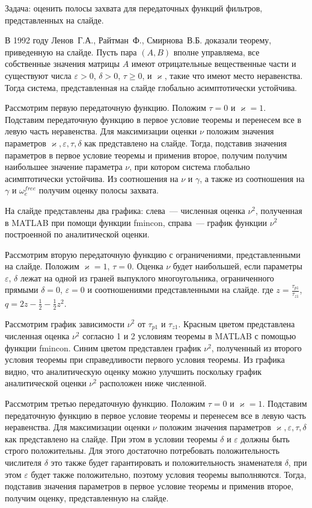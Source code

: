 \documentclass[a4paper,article,14pt]{extarticle}
\begin{document}
Задача: оценить полосы захвата для передаточных функций фильтров, представленных на слайде.
    
В 1992 году Ленов~Г.\:А., Райтман~Ф., Смирнова~В.\:Б. доказали теорему, приведенную на слайде. Пусть пара $(A, B)$ вполне управляема, все собственные значения матрицы $A$ имеют отрицательные вещественные части и существуют числа $\varepsilon > 0$, $\delta > 0$, $\tau \geqslant 0$, и $\varkappa$, такие что имеют место неравенства. Тогда система, представленная на слайде глобально асимптотически устойчива.

Рассмотрим первую передаточную функцию. Положим $\tau = 0$ и $\varkappa = 1$. Подставим передаточную функцию в первое условие теоремы и перенесем все в левую часть неравенства. Для максимизации оценки $\nu$ положим значения параметров $\varkappa, \varepsilon, \tau, \delta$ как представлено на слайде. Тогда, подставив значения параметров в первое условие теоремы и применив второе, получим получим наибольшее значение параметра $\nu$, при котором система глобально асимптотически устойчива. Из соотношения на $\nu$ и $\gamma$, а также из соотношения на $\gamma$ и $\omega_e^{free}$ получим оценку полосы захвата.

На слайде представлены два графика: слева~--- численная оценка $\nu^2$, полученная в MATLAB при помощи функции fmincon, справа~--- график функции $\nu^2$ построенной по аналитической оценки.

Рассмотрим вторую передаточную функцию с ограничениями, представленными на слайде. Положим $\varkappa=1$, $\tau=0$. Оценка $\nu$ будет наибольшей, если параметры $\varepsilon$, $\delta$ лежат на одной из граней выпуклого многоугольника, ограниченного прямыми $\delta = 0$, $\varepsilon = 0$ и соотношениями представленными на слайде. где $z = \frac{\tau_{p1}}{\tau_{z1}}$, $q = 2z - \frac{1}{2} - \frac{1}{2}z^2$. 

Рассмотрим график зависимости $\nu^2$ от $\tau_{p1}$ и $\tau_{z1}$. Красным цветом представлена численная оценка $\nu^2$ согласно 1 и 2 условиям теоремы в MATLAB с помощью функции fmincon. Синим цветом представлен график $\nu^2$, полученный из второго условия теоремы при справедливости первого условия теоремы. Из графика видно, что аналитическую оценку можно улучшить поскольку график аналитической оценки $\nu^2$ расположен ниже численной.

Рассмотрим третью передаточную функцию. Положим $\tau = 0$ и $\varkappa = 1$. Подставим передаточную функцию в первое условие теоремы и перенесем все в левую часть неравенства. Для максимизации оценки $\nu$ положим значения параметров $\varkappa, \varepsilon, \tau, \delta$ как представлено на слайде. При этом в условии теоремы $\delta$ и $\varepsilon$ должны быть строго положительны. Для этого достаточно потребовать положительность числителя $\delta$ это также будет гарантировать и положительность знаменателя $\delta$, при этом $\varepsilon$ будет также положительно, поэтому условия теоремы выполняются. Тогда, подставив значения параметров в первое условие теоремы и применив второе, получим оценку, представленную на слайде.
\end{document}
